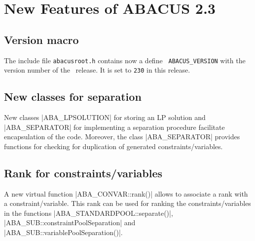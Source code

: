 \section{New Features of ABACUS 2.3}
\label{section:new23}

\subsection{Version macro}

The include file {\tt abacusroot.h} contains now a define {\tt
ABACUS\_VERSION} with the version number of the \ABACUS\ release. It
is set to {\tt 230} in this release.

\subsection{New classes for separation}

New classes |ABA\_LPSOLUTION| for storing an LP solution and
|ABA\_SEPARATOR| for implementing a separation procedure 
facilitate encapsulation of the code. Moreover,
the class |ABA\_SEPARATOR| provides
functions for checking for duplication of generated constraints/variables.



\subsection{Rank for constraints/variables}

A new virtual function |ABA\_CONVAR::rank()| allows to
associate a rank with a constraint/variable.
This rank can be used for ranking the  constraints/variables in the 
functions |ABA\_STANDARDPOOL::separate()|,
|ABA\_SUB::constraintPoolSeparation| and |ABA\_SUB::variablePoolSeparation()|.


